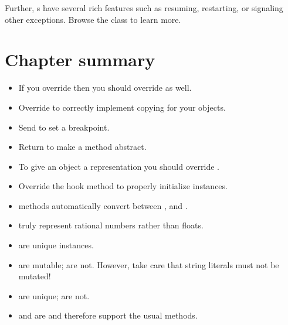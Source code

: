 \documentclass[a4paper,10pt,twoside]{book}
\begin{document}
Further, s have several rich features such as resuming, restarting, or signaling other exceptions.
Browse the class  to learn more.


\section{Chapter summary}

\begin{itemize}

  \item If you override \ct{=} then you should override  as well.

  \item Override  to correctly implement copying for your objects.

  \item Send  to set a breakpoint.

  \item Return  to make a method abstract.

  \item To give an object a  representation you should override .

  \item Override the hook method  to properly initialize instances.

  \item {} methods automatically convert between ,  and .

  \item {} truly represent rational numbers rather than floats.

  \item {} are unique instances.

  \item {} are mutable;  are not.
  However, take care that string literals must not be mutated!

  \item {} are unique;  are not.

  \item {} and  are  and therefore support the usual  methods.

\end{itemize}

\ifx\wholebook\relax\else
   
   
\end{document}
